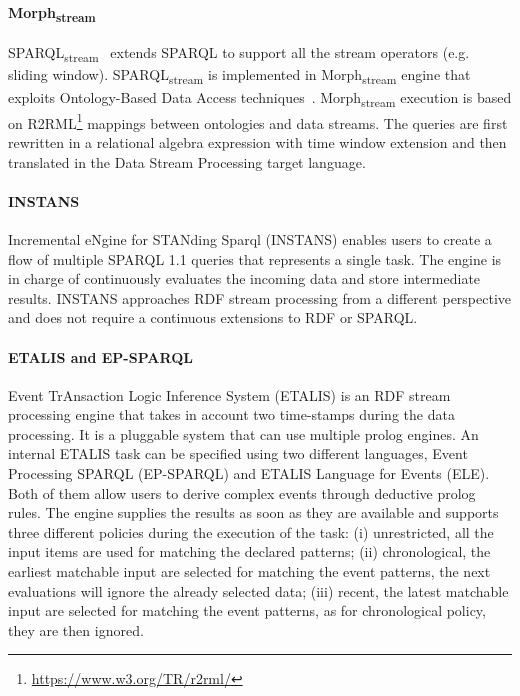 \paragraph{Morph\textsubscript{stream}}
SPARQL\textsubscript{stream}~\cite{DBLP:conf/semweb/CalbimonteCG10} extends SPARQL to support all the stream operators (e.g. sliding window).
SPARQL\textsubscript{stream} is implemented in Morph\textsubscript{stream} engine that exploits Ontology-Based Data Access techniques~\cite{DBLP:journals/ijswis/CalbimonteJCA12}.
Morph\textsubscript{stream} execution is based on R2RML\footnote{\url{https://www.w3.org/TR/r2rml/}} mappings between ontologies and data streams.
The queries are first rewritten in a relational algebra expression with time window extension and then translated in the Data Stream Processing target language.

\paragraph{INSTANS}
Incremental eNgine for STANding Sparql (INSTANS) \cite{DBLP:conf/semweb/RinneNT12} enables users to create a flow of multiple SPARQL 1.1 queries that represents a single task. The engine is in charge of continuously evaluates the incoming data and store intermediate results. INSTANS approaches RDF stream processing from a different perspective and does not require a continuous extensions to RDF or SPARQL.

\paragraph{ETALIS and EP-SPARQL}
Event TrAnsaction Logic Inference System (ETALIS) \cite{DBLP:journals/semweb/AnicicRFS12} is an RDF stream processing engine that takes in account two time-stamps during the data processing.
It is a pluggable system that can use multiple prolog engines.
An internal ETALIS task can be specified using two different languages, Event Processing SPARQL (EP-SPARQL) and ETALIS Language for Events (ELE). Both of them allow users to derive complex events through deductive prolog rules. 
The engine supplies the results as soon as they are available and supports three different policies during the execution of the task: (i) unrestricted, all the input items are used for matching the declared patterns; (ii) chronological, the earliest matchable input are selected for matching the event patterns, the next evaluations will ignore the already selected data; (iii) recent, the latest matchable input are selected for matching the event patterns, as for chronological policy, they are then ignored.

